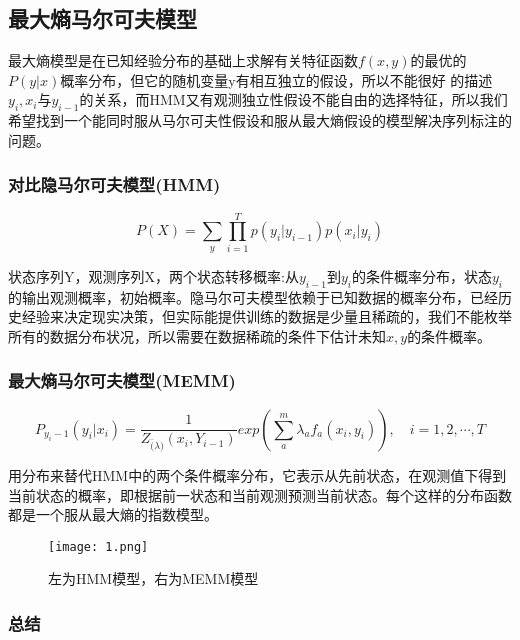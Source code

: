 \documentclass[bwprint]{cumcmthesis}
\begin{document}
\subsection{最大熵马尔可夫模型}

最大熵模型是在已知经验分布的基础上求解有关特征函数$f(x,y)$的最优的$P(y|x)$概率分布，但它的随机变量y有相互独立的假设，所以不能很好 的描述$y_i, x_i$与$y_{i-1}$的关系，而HMM又有观测独立性假设不能自由的选择特征，所以我们希望找到一个能同时服从马尔可夫性假设和服从最大熵假设的模型解决序列标注的问题。

\subsubsection{对比隐马尔可夫模型(HMM)} 

\begin{equation}
	P(X) = \sum\limits_{y} \prod\limits_{i=1}^{T} p(y_i|y_{i-1})p(x_i|y_i)
\end{equation}

状态序列Y，观测序列X，两个状态转移概率:从$y_{i-1}$到$y_i$的条件概率分布，状态$y_i$的输出观测概率，初始概率。隐马尔可夫模型依赖于已知数据的概率分布，已经历史经验来决定现实决策，但实际能提供训练的数据是少量且稀疏的，我们不能枚举所有的数据分布状况，所以需要在数据稀疏的条件下估计未知$x,y$的条件概率。 

\subsubsection{最大熵马尔可夫模型(MEMM)} 

\begin{equation}
	P_{y_i-1}(y_i|x_i)	= \frac{1}{Z_{\bar(\lambda)}(x_i,Y_{i-1})}exp\left( \sum\limits^{m}_{a}\lambda_a f_a(x_i,y_i) \right), \quad i = 1,2,\cdots,T
\end{equation}

用分布来替代HMM中的两个条件概率分布，它表示从先前状态，在观测值下得到当前状态的概率，即根据前一状态和当前观测预测当前状态。每个这样的分布函数都是一个服从最大熵的指数模型。 

\begin{figure}[!htp]
\centering
\texttt{[image: 1.png]}
\caption{左为HMM模型，右为MEMM模型}
\label{左为HMM模型，右为MEMM模型}
\end{figure}

\subsubsection{总结} 
\end{document}
